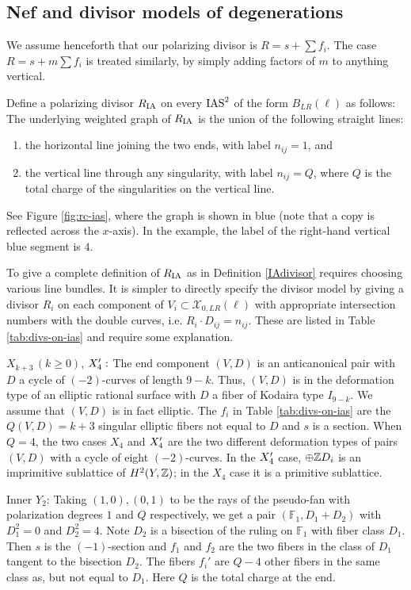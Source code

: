 \documentclass[table,x11names]{amsart}
\begin{document}
\subsection{Nef and divisor models of degenerations}
\label{sec:D-models}

We assume henceforth that our polarizing divisor is $R=s+\sum f_i$.
The case $R=s+m\sum f_i$ is treated similarly, by simply 
adding factors of $m$ to anything vertical.

Define a polarizing divisor $R_{{\rm IA}}$ on every $\operatorname{IAS}^2$
of the form $B_{LR}(\ell)$ as follows:
The underlying weighted graph of $R_{{\rm IA}}$ is the 
union of the following straight lines:
\begin{enumerate}
\item the horizontal line joining the two ends, with label $n_{ij}=1$, and
\item the vertical line through any singularity, with label $n_{ij}=Q$, where
$Q$ is the total charge of the singularities on the vertical line. 
\end{enumerate}
See Figure \ref{fig:rc-ias}, where the graph
is shown in blue 
(note that a copy is reflected across the $x$-axis). In the example,
the label of the right-hand
vertical blue segment is $4$.

To give a complete definition of $R_{{\rm IA}}$ as in
Definition \ref{IAdivisor} requires choosing various line bundles. It is simpler
to directly specify the divisor model by giving a
divisor $R_i$ on each component of
$V_i\subset \mathcal{X}_{0,LR}(\ell)$ with appropriate intersection
numbers with the double curves, i.e. $R_i\cdot D_{ij}=n_{ij}$. 
These are listed in Table \ref{tab:divs-on-ias}
and require some explanation.

\medskip
${X_{k+3}\,(k\geq 0)}$, ${X'_4:}$
The end component $(V,D)$ is an anticanonical pair
with $D$ a cycle of $(-2)$-curves of length $9-k$. Thus, $(V,D)$ is in the deformation
type of an elliptic rational surface with $D$ a fiber of 
Kodaira type $I_{9-k}$. We assume that $(V,D)$ is in fact elliptic.
The $f_i$ in Table \ref{tab:divs-on-ias} are the $Q(V,D)=k+3$
singular elliptic fibers not equal to $D$ and $s$ is a section.
When $Q=4$, the two cases $X_4$ and $X'_4$
are the two different deformation types of pairs $(V,D)$
with a cycle of eight $(-2)$-curves. In the $X'_4$ case,
$\oplus \mathbb{Z} D_i$ is an imprimitive
sublattice of $H^2(Y,\mathbb{Z})$; in the $X_4$ case it is a primitive sublattice.

\smallskip
{Inner ${ Y_2}$:} Taking $(1,0),(0,1)$ to be the rays of the pseudo-fan
with polarization degrees $1$ and $Q$ respectively,
we get a pair $(\mathbb{F}_1 , D_1+D_2)$ with
$D_1^2=0$ and $D_2^2=4$.
Note $D_2$ is a bisection of the ruling on $\mathbb{F}_1$ with fiber
class $D_1$. Then $s$ is the $(-1)$-section
and $f_1$ and $f_2$ are the two fibers in the class of $D_1$
tangent to the bisection $D_2$. 
The fibers $f_i'$ are $Q-4$ other fibers in the same class as,
but not equal to $D_1$.
Here $Q$ is the total charge at the end.
\end{document}
